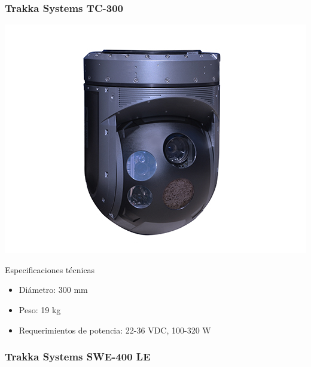 \subsubsection*{Trakka Systems TC-300}

\noindent\begin{minipage}{0.3\textwidth}%
	\includegraphics[width=\linewidth]{imagenes/TC-300}
\end{minipage}%
\hfill%
\begin{minipage}{0.7\textwidth}
	Especificaciones técnicas
	\begin{itemize}
		\item Diámetro: 300 mm
		\item Peso: 19 kg
		\item Requerimientos de potencia: 22-36 VDC, 100-320 W
	\end{itemize}
\end{minipage}

\subsubsection*{Trakka Systems SWE-400 LE}

